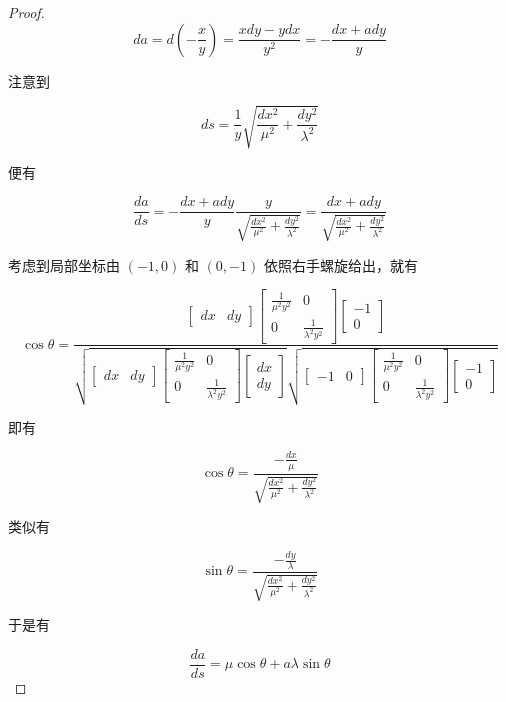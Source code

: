 \documentclass[a4paper,12pt]{article}
\numberwithin{problem}{section}
\numberwithin{definition}{section}
\numberwithin{lemma}{section}
\numberwithin{proposition}{section}
\numberwithin{theorem}{section}
\numberwithin{grammar}{section}
\numberwithin{program}{section}
\numberwithin{convention}{section}
\numberwithin{corollary}{section}
\begin{document}
\begin{proof}
$$
da = d(-\frac{x}{y}) = \frac{xdy - ydx}{y^2} = -\frac{dx + a dy}{y}
$$

注意到

$$
ds = \frac{1}{y}\sqrt{\frac{dx^2}{\mu^2} + \frac{dy^2}{\lambda^2}}
$$

便有

$$
\frac{da}{ds} = - \frac{dx + a dy}{y} \frac{y}{\sqrt{\frac{dx^2}{\mu^2} + \frac{dy^2}{\lambda^2}}} = \frac{dx + a dy}{\sqrt{\frac{dx^2}{\mu^2} + \frac{dy^2}{\lambda^2}}}
$$

考虑到局部坐标由 $(-1, 0)$ 和 $(0, -1)$ 依照右手螺旋给出，就有

$$
\cos \theta = \frac{\begin{bmatrix} dx & dy \end{bmatrix} \begin{bmatrix} \frac{1}{\mu^2 y^2} & 0 \\ 0 & \frac{1}{\lambda^2 y^2} \end{bmatrix} \begin{bmatrix} -1 \\ 0 \end{bmatrix}}{\sqrt{\begin{bmatrix} dx & dy \end{bmatrix} \begin{bmatrix} \frac{1}{\mu^2 y^2} & 0 \\ 0 & \frac{1}{\lambda^2 y^2} \end{bmatrix} \begin{bmatrix} dx \\ dy \end{bmatrix}}\sqrt{\begin{bmatrix} -1 & 0 \end{bmatrix} \begin{bmatrix} \frac{1}{\mu^2 y^2} & 0 \\ 0 & \frac{1}{\lambda^2 y^2} \end{bmatrix} \begin{bmatrix} -1 \\ 0 \end{bmatrix}}}
$$

即有

$$
\cos \theta = \frac{-\frac{dx}{\mu}}{\sqrt{\frac{dx^2}{\mu^2} + \frac{dy^2}{\lambda^2}}}
$$

类似有

$$
\sin \theta = \frac{-\frac{dy}{\lambda}}{\sqrt{\frac{dx^2}{\mu^2} + \frac{dy^2}{\lambda^2}}}
$$

于是有

$$
\frac{da}{ds} = \mu \cos \theta + a \lambda \sin \theta
$$

\end{proof}
\end{document}
